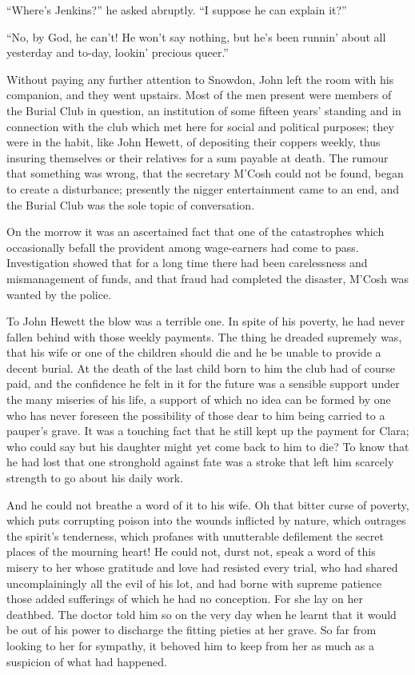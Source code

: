 ``Where's Jenkins?'' he asked abruptly. ``I suppose he can explain it?''

``No, by God, he can't! He won't say nothing, but he's been runnin'
about all yesterday and to-day, lookin' precious queer.''

Without paying any further attention to Snowdon, John left the room with
his companion, and they went upstairs. Most of the men present were
members of the Burial Club in question, an institution of some fifteen
years' standing and in connection with the club which met here for
social and political purposes; they were in the habit, like John Hewett,
of depositing their coppers weekly, thus insuring themselves or their
relatives for a sum payable at death. The rumour that something was
wrong, that the secretary M'Cosh could not be found, began to create a
disturbance; presently the nigger entertainment came to an end, and the
Burial Club was the sole topic of conversation.

On the morrow it was an ascertained fact
{\protect\hypertarget{159}{}{}}that one of the catastrophes which
occasionally befall the provident among wage-earners had come to pass.
Investigation showed that for a long time there had been carelessness
and mismanagement of funds, and that fraud had completed the disaster,
M'Cosh was wanted by the police.

To John Hewett the blow was a terrible one. In spite of his poverty, he
had never fallen behind with those weekly payments. The thing he dreaded
supremely was, that his wife or one of the children should die and he be
unable to provide a decent burial. At the death of the last child born
to him the club had of course paid, and the confidence he felt in it for
the future was a sensible support under the many miseries of his life, a
support of which no idea can be formed by one who has never foreseen the
possibility of those dear to him being carried to a pauper's grave. It
was a touching fact that he still kept up the payment for Clara; who
could say but his daughter might yet come back to him to die? To know
that he had lost that one stronghold
{\protect\hypertarget{160}{}{}}against fate was a stroke that left him
scarcely strength to go about his daily work.

And he could not breathe a word of it to his wife. Oh that bitter curse
of poverty, which puts corrupting poison into the wounds inflicted by
nature, which outrages the spirit's tenderness, which profanes with
unutterable defilement the secret places of the mourning heart! He could
not, durst not, speak a word of this misery to her whose gratitude and
love had resisted every trial, who had shared uncomplainingly all the
evil of his lot, and had borne with supreme patience those added
sufferings of which he had no conception. For she lay on her deathbed.
The doctor told him so on the very day when he learnt that it would be
out of his power to discharge the fitting pieties at her grave. So far
from looking to her for sympathy, it behoved him to keep from her as
much as a suspicion of what had happened.

